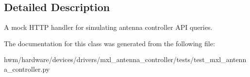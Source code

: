 \subsection{Detailed Description}
A mock H\-T\-T\-P handler for simulating antenna controller A\-P\-I queries. 



The documentation for this class was generated from the following file\-:\begin{DoxyCompactItemize}
\item 
hwm/hardware/devices/drivers/mxl\-\_\-antenna\-\_\-controller/tests/test\-\_\-mxl\-\_\-antenna\-\_\-controller.\-py\end{DoxyCompactItemize}
